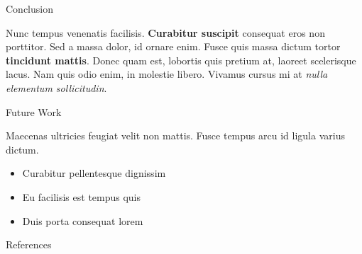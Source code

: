 \documentclass[final]{beamer}
\newlength{\onecolwid}
\begin{document}
\begin{frame}
\begin{columns}[t]
\begin{column}{\onecolwid} %


\begin{exampleblock}{Conclusion}

Nunc tempus venenatis facilisis. \textbf{Curabitur suscipit} consequat eros non porttitor. Sed a massa dolor, id ornare enim. Fusce quis massa dictum tortor \textbf{tincidunt mattis}. Donec quam est, lobortis quis pretium at, laoreet scelerisque lacus. Nam quis odio enim, in molestie libero. Vivamus cursus mi at \textit{nulla elementum sollicitudin}.

\end{exampleblock}


\begin{exampleblock}{Future Work}

Maecenas ultricies feugiat velit non mattis. Fusce tempus arcu id ligula varius dictum. 
\begin{itemize}
\item Curabitur pellentesque dignissim
\item Eu facilisis est tempus quis
\item Duis porta consequat lorem
\end{itemize}

\end{exampleblock}


\begin{exampleblock}{References}

\nocite{*} %
\small{
\vspace{1cm}}
\end{exampleblock}



\end{column}
\end{columns}
\end{frame}
\end{document}
